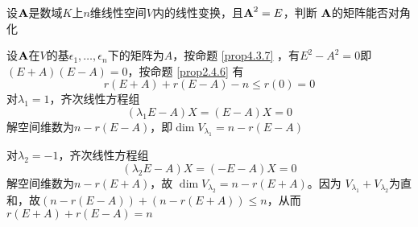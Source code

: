 \documentclass[11pt]{article}
\begin{document}
\begin{examplle}[]
设\(\operatorname{\textbf{A}}\)是数域\(K\)上\(n\)维线性空间\(V\)内的线性变换，且\(\operatorname{\textbf{A}}^2=E\)，判断
\(\operatorname{\textbf{A}}\)的矩阵能否对角化

设\(\operatorname{\textbf{A}}\)在\(V\)的基\(\epsilon_1,\dots,\epsilon_n\)下的矩阵为\(A\)，按命题
\ref{prop4.3.7} ，有\(E^2-A^2=0\)即\((E+A)(E-A)=0\)，按命题 \ref{prop2.4.6} 有
\begin{equation*}
r(E+A)+r(E-A)-n\le r(0)=0
\end{equation*}
对\(\lambda_1=1\)，齐次线性方程组
\begin{equation*}
(\lambda_1 E-A)X=(E-A)X=0
\end{equation*}
解空间维数为\(n-r(E-A)\)，即\(\dim V_{\lambda_1}=n-r(E-A)\)

对\(\lambda_2=-1\)，齐次线性方程组
\begin{equation*}
(\lambda_2 E-A)X=(-E-A)X=0
\end{equation*}
解空间维数为\(n-r(E+A)\)，故 \(\dim V_{\lambda_2}=n-r(E+A)\)。因为
\(V_{\lambda_1}+V_{\lambda_2}\)为直和，故\((n-r(E-A))+(n-r(E+A))\le n\)，从而\(r(E+A)+r(E-A)=n\)
\end{examplle}
\end{document}
